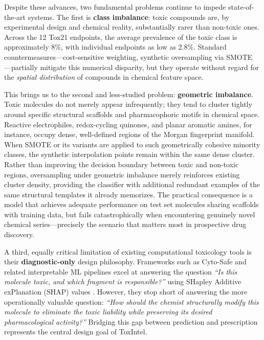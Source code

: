 \documentclass[lettersize,journal]{IEEEtran}
\begin{document}
  Despite these advances, two fundamental problems continue to impede
  state-of-the-art systems.
  The first is \textbf{class imbalance}: toxic compounds are, by experimental
  design and chemical reality, substantially rarer than non-toxic ones.
  Across the 12 Tox21 endpoints, the average prevalence of the toxic class is
  approximately 8\%, with individual endpoints as low as 2.8\%.
  Standard countermeasures---cost-sensitive weighting, synthetic oversampling via
  SMOTE \cite{barua}---partially mitigate this numerical disparity, but they
  operate without regard for the \textit{spatial distribution} of compounds in
  chemical feature space.

  This brings us to the second and less-studied problem:
  \textbf{geometric imbalance}.
  Toxic molecules do not merely appear infrequently; they tend to cluster tightly
  around specific structural scaffolds and pharmacophoric motifs in chemical
  space.
  Reactive electrophiles, redox-cycling quinones, and planar aromatic amines, for
  instance, occupy dense, well-defined regions of the Morgan fingerprint manifold.
  When SMOTE or its variants are applied to such geometrically cohesive minority
  classes, the synthetic interpolation points remain within the same dense cluster.
  Rather than improving the decision boundary between toxic and non-toxic regions,
  oversampling under geometric imbalance merely reinforces existing cluster
  density, providing the classifier with additional redundant examples of the same
  structural templates it already memorizes.
  The practical consequence is a model that achieves adequate performance on
  test set molecules sharing scaffolds with training data, but fails
  catastrophically when encountering genuinely novel chemical series---precisely
  the scenario that matters most in prospective drug discovery.

  A third, equally critical limitation of existing computational toxicology tools
  is their \textbf{diagnostic-only} design philosophy.
  Frameworks such as Cyto-Safe \cite{feitosa} and related interpretable ML
  pipelines excel at answering the question \textit{``Is this molecule toxic, and
  which fragment is responsible?''} using SHapley Additive exPlanation (SHAP)
  values \cite{lundberg2017}.
  However, they stop short of answering the more operationally valuable question:
  \textit{``How should the chemist structurally modify this molecule to eliminate
  the toxic liability while preserving its desired pharmacological activity?''}
  Bridging this gap between prediction and prescription represents the central
  design goal of ToxIntel.
\end{document}
